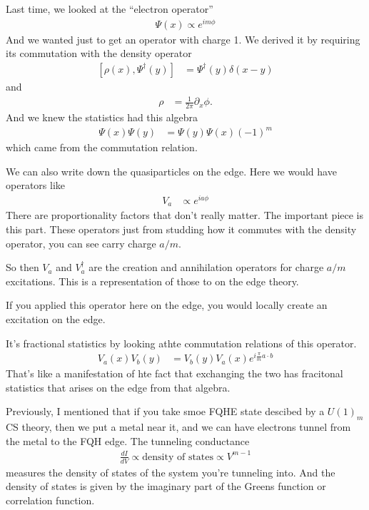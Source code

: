 Last time,
we looked at the ``electron operator''
\begin{align}
    \Psi(x)
    \propto e^{im\phi}
\end{align}
And we wanted just to get an operator with charge 1.
We derived it by requiring its commutation with the density operator
\begin{align}
    \left[ \rho(x), \Psi^\dagger(y) \right]
    &=
    \Psi^\dagger (y) \delta\left( x - y \right)
\end{align}
and
\begin{align}
    \rho &= \frac{1}{2\pi} \partial_x \phi.
\end{align}
And we knew the statistics had this algebra
\begin{align}
    \Psi(x) \Psi(y)
    &=
    \Psi(y)\Psi(x)
    \left( -1 \right)^{m}
\end{align}
which came from the commutation relation.

We can also write down the quasiparticles on the edge.
Here we would have operators like
\begin{align}
    V_a &\propto
    e^{ia\phi}
\end{align}
There are proportionality factors that don't really matter.
The important piece is this part.
These operators just from studding how it commutes with the density operator,
you can see carry charge $a/m$.

So then $V_a$ and $V_a^\dagger$ are the creation and annihilation operators for
charge $a/m$ excitations.
This is a representation of those to on the edge theory.

If you applied this operator here on the edge,
you would locally create an excitation on the edge.

It's fractional statistics by looking athte commutation relations of this
operator.
\begin{align}
    V_a(x) V_b(y)
    &=
    V_b(y) V_a(x)
    e^{i\frac{\pi}{m} a\cdot b}
\end{align}
That's like a manifestation of hte fact that exchanging the two has fracitonal
statistics
that arises on the edge from that algebra.

Previously,
I mentioned that if you take smoe FQHE state descibed by a $U(1)_m$ CS theory,
then we put a metal near it,
and we can have electrons tunnel from the metal to the FQH edge.
The tunneling conductance
\begin{align}
    \frac{dI}{dV} \propto
    \text{density of states}
    \propto
    V^{m-1}
\end{align}
measures the density of states of the system you're tunneling into.
And the density of states is given by the imaginary part of the Greens function
or correlation function.

